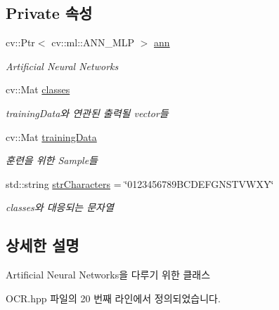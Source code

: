 \subsection*{Private 속성}
\begin{DoxyCompactItemize}
\item 
\mbox{\label{class_o_c_r_a498a8acb578f60aad04d90704b2365b8}} 
cv\+::\+Ptr$<$ cv\+::ml\+::\+A\+N\+N\+\_\+\+M\+LP $>$ \hyperlink{class_o_c_r_a498a8acb578f60aad04d90704b2365b8}{ann}
\begin{DoxyCompactList}\small\item\em Artificial Neural Networks \end{DoxyCompactList}\item 
\mbox{\label{class_o_c_r_a57d7a81d01e81fa3008acc53074ce73f}} 
cv\+::\+Mat \hyperlink{class_o_c_r_a57d7a81d01e81fa3008acc53074ce73f}{classes}
\begin{DoxyCompactList}\small\item\em training\+Data와 연관된 출력될 vector들 \end{DoxyCompactList}\item 
\mbox{\label{class_o_c_r_a2c5101fa102a3fbb66144b3f511b3bd5}} 
cv\+::\+Mat \hyperlink{class_o_c_r_a2c5101fa102a3fbb66144b3f511b3bd5}{training\+Data}
\begin{DoxyCompactList}\small\item\em 훈련을 위한 Sample들 \end{DoxyCompactList}\item 
\mbox{\label{class_o_c_r_acc9af89294d62414e9e7ccddd2d169dc}} 
std\+::string \hyperlink{class_o_c_r_acc9af89294d62414e9e7ccddd2d169dc}{str\+Characters} = \char`\"{}0123456789\+B\+C\+D\+E\+F\+G\+N\+S\+T\+V\+W\+X\+Y\char`\"{}
\begin{DoxyCompactList}\small\item\em classes와 대응되는 문자열 \end{DoxyCompactList}\end{DoxyCompactItemize}


\subsection{상세한 설명}
Artificial Neural Networks을 다루기 위한 클래스 

O\+C\+R.\+hpp 파일의 20 번째 라인에서 정의되었습니다.



